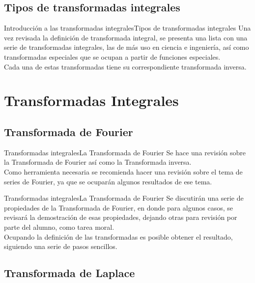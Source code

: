 \documentclass[10pt]{beamer}
\begin{document}
\subsection{Tipos de transformadas integrales}

\begin{frame}{Introducción a las transformadas integrales}{Tipos de transformadas integrales}
Una vez revisada la definición de transformada integral, se presenta una lista con una serie de transformadas integrales, las de más uso en ciencia e ingeniería, así como transformadas especiales que se ocupan a partir de funciones especiales.
\\
\bigskip
\pause
Cada una de estas transformadas tiene su correspondiente transformada inversa.
\end{frame}
\section{Transformadas Integrales}
\subsection{Transformada de Fourier}

\begin{frame}{Transformadas integrales}{La Transformada de Fourier}
Se hace una revisión sobre la Transformada de Fourier así como la Transformada inversa.
\\
\bigskip
\pause
Como herramienta necesaria se recomienda hacer una revisión sobre el tema de series de Fourier, ya que se ocuparán algunos resultados de ese tema.
\end{frame}
\begin{frame}{Transformadas integrales}{La Transformada de Fourier}
Se discutirán una serie de propiedades de la Transformada de Fourier, en donde para algunos casos, se revisará la demostración de esas propiedades, dejando otras para revisión por parte del alumno, como tarea moral.
\\
\bigskip
\pause
Ocupando la definición de las transformadas es posible obtener el resultado, siguiendo una serie de pasos sencillos.
\end{frame}
\subsection{Transformada de Laplace}
\end{document}
